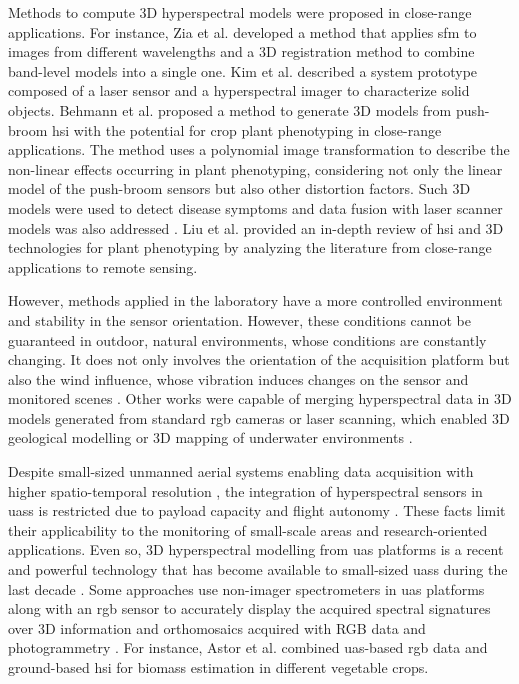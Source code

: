 Methods to compute 3D hyperspectral models were proposed in close-range applications. For instance, Zia et al. \cite{zia_3d_2015} developed a method that applies \acrshort{sfm} to images from different wavelengths and a 3D registration method to combine band-level models into a single one. Kim et al. \cite{kim_3d_2012} described a system prototype composed of a laser sensor and a hyperspectral imager to characterize solid objects. Behmann et al. \cite{behmann_calibration_2015} proposed a method to generate 3D models from push-broom \acrshort{hsi} with the potential for crop plant phenotyping in close-range applications. The method uses a polynomial image transformation to describe the non-linear effects occurring in plant phenotyping, considering not only the linear model of the push-broom sensors but also other distortion factors. Such 3D models were used to detect disease symptoms \cite{roscher_detection_2016} and data fusion with laser scanner models was also addressed \cite{behmann_generation_2016}. Liu et al. \cite{liu_hyperspectral_2020} provided an in-depth review of \acrshort{hsi} and 3D technologies for plant phenotyping by analyzing the literature from close-range applications to remote sensing.

However, methods applied in the laboratory have a more controlled environment and stability in the sensor orientation. However, these conditions cannot be guaranteed in outdoor, natural environments, whose conditions are constantly changing. It does not only involves the orientation of the acquisition platform but also the wind influence, whose vibration induces changes on the sensor and monitored scenes \cite{kalisperakis_leaf_2015}. Other works were capable of merging hyperspectral data in 3D models generated from standard \acrshort{rgb} cameras or laser scanning, which enabled 3D geological modelling \cite{nieto_3d_2010} or 3D mapping of underwater environments \cite{ferrera_hyperspectral_2021}. 

Despite small-sized unmanned aerial systems enabling data acquisition with higher spatio-temporal resolution \cite{padua_uas_2017}, the integration of hyperspectral sensors in \acrshort{uas}s is restricted due to payload capacity and flight autonomy \cite{bruning_approaches_2020}. These facts limit their applicability to the monitoring of small-scale areas and research-oriented applications. Even so, 3D hyperspectral modelling from \acrshort{uas} platforms is a recent and powerful technology that has become available to small-sized \acrshort{uas}s during the last decade \cite{nevalainen_individual_2017}. Some approaches use non-imager spectrometers in \acrshort{uas} platforms along with an \acrshort{rgb} sensor to accurately display the acquired spectral signatures over 3D information and orthomosaics acquired with RGB data and photogrammetry \cite{garzonio_surface_2017}. For instance, Astor et al. \cite{astor_vegetable_2020} combined \acrshort{uas}-based \acrshort{rgb} data and ground-based \acrshort{hsi} for biomass estimation in different vegetable crops.

